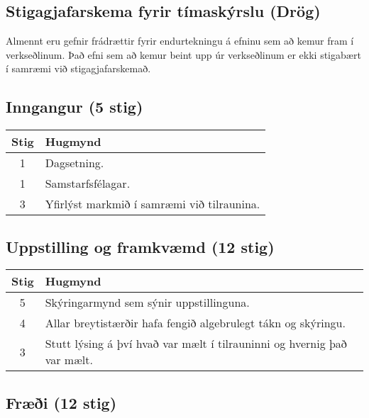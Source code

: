 \newpage


\begin{tcolorbox}

\section*{Stigagjafarskema fyrir tímaskýrslu (Drög)}

Almennt eru gefnir frádrættir fyrir endurtekningu á efninu sem að kemur fram í verkseðlinum. Það efni sem að kemur beint upp úr verkseðlinum er ekki stigabært í samræmi við stigagjafarskemað.

\subsection*{Inngangur (5 stig)}

\begin{table}[H]
    \centering
    \begin{tabular}{|c|l|}
    \hline
       \textbf{Stig}  & \textbf{Hugmynd}   \\ \hline \hline
        1  & Dagsetning. \\ \hline
        1  & Samstarfsfélagar. \\ \hline
        3  & Yfirlýst markmið í samræmi við tilraunina. \\ \hline
    \end{tabular}
\end{table}

\subsection*{Uppstilling og framkvæmd (12 stig)}

\begin{table}[H]
    \centering
    \begin{tabular}{|c|l|}
    \hline
       \textbf{Stig}  & \textbf{Hugmynd}   \\ \hline \hline
        5  & Skýringarmynd sem sýnir uppstillinguna. \\ \hline
        4  & Allar breytistærðir hafa fengið algebrulegt tákn og skýringu. \\ \hline
        3  & Stutt lýsing á því hvað var mælt í tilrauninni og hvernig það var mælt. \\ \hline
    \end{tabular}
\end{table}

\subsection*{Fræði (12 stig)}


\end{tcolorbox}
